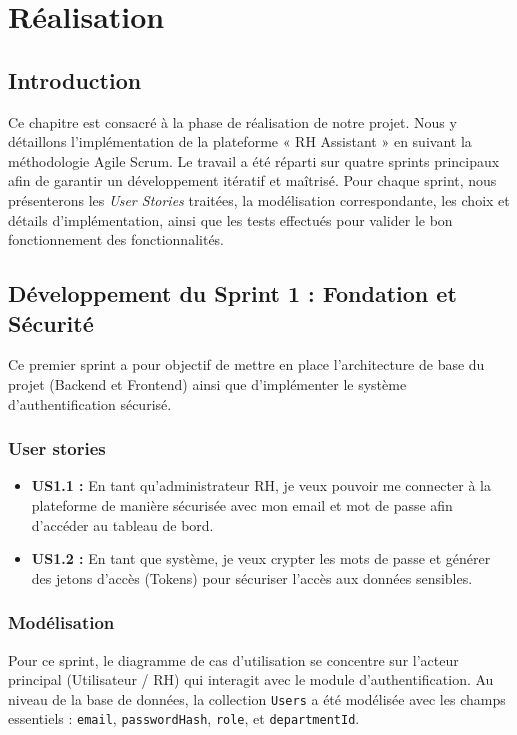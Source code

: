 \chapter{Réalisation}

\section*{Introduction}
Ce chapitre est consacré à la phase de réalisation de notre projet. Nous y détaillons l'implémentation de la plateforme « RH Assistant » en suivant la méthodologie Agile Scrum. Le travail a été réparti sur quatre sprints principaux afin de garantir un développement itératif et maîtrisé. Pour chaque sprint, nous présenterons les \textit{User Stories} traitées, la modélisation correspondante, les choix et détails d'implémentation, ainsi que les tests effectués pour valider le bon fonctionnement des fonctionnalités.

\section{Développement du Sprint 1 : Fondation et Sécurité}
Ce premier sprint a pour objectif de mettre en place l'architecture de base du projet (Backend et Frontend) ainsi que d'implémenter le système d'authentification sécurisé.

\subsection{User stories}
\begin{itemize}
    \item \textbf{US1.1 :} En tant qu'administrateur RH, je veux pouvoir me connecter à la plateforme de manière sécurisée avec mon email et mot de passe afin d'accéder au tableau de bord.
    \item \textbf{US1.2 :} En tant que système, je veux crypter les mots de passe et générer des jetons d'accès (Tokens) pour sécuriser l'accès aux données sensibles.
\end{itemize}

\subsection{Modélisation}
Pour ce sprint, le diagramme de cas d'utilisation se concentre sur l'acteur principal (Utilisateur / RH) qui interagit avec le module d'authentification. Au niveau de la base de données, la collection \texttt{Users} a été modélisée avec les champs essentiels : \texttt{email}, \texttt{passwordHash}, \texttt{role}, et \texttt{departmentId}.

